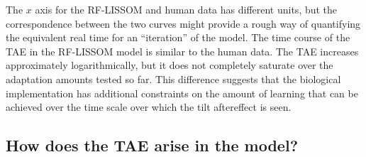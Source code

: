 \documentclass[10pt]{article}   %
\begin{document}
The $x$ axis for the RF-LISSOM and human data has different units, but
the correspondence between the two curves might provide a rough way of
quantifying the equivalent real time for an ``iteration'' of the
model.  The time course of the TAE in the RF-LISSOM model is similar
to the human data.  The TAE increases approximately logarithmically,
but it does not completely saturate over the adaptation amounts tested
so far.  This difference suggests that the biological implementation
has additional constraints on the amount of learning that can be
achieved over the time scale over which the tilt aftereffect is seen.


\subsection{How does the TAE arise in the model?}
\end{document}
